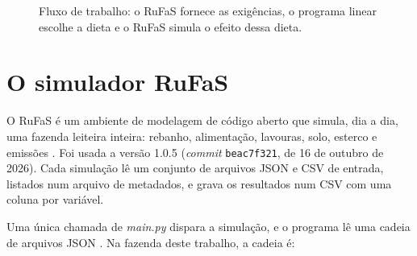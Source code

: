\documentclass[a4paper,12pt]{article}
\begin{document}
\begin{figure}[htbp]
\centering
{}
\caption{Fluxo de trabalho: o RuFaS fornece as exigências, o programa linear escolhe a dieta e o RuFaS simula o efeito dessa dieta.}
\label{fig:fluxo}
\end{figure}

\newpage
\section{O simulador RuFaS}\label{sec:rufas}

O RuFaS é um ambiente de modelagem de código aberto que simula, dia a dia, uma fazenda leiteira inteira: rebanho, alimentação, lavouras, solo, esterco e emissões \cite{website:rufas, website:rufasdocs}. Foi usada a versão 1.0.5 (\textit{commit} \texttt{beac7f321}, de 16 de outubro de 2026). Cada simulação lê um conjunto de arquivos JSON e CSV de entrada, listados num arquivo de metadados, e grava os resultados num CSV com uma coluna por variável.

Uma única chamada de \textit{main.py} dispara a simulação, e o programa lê uma cadeia de arquivos JSON \cite{slides:rufas}. Na fazenda deste trabalho, a cadeia é:
\end{document}
